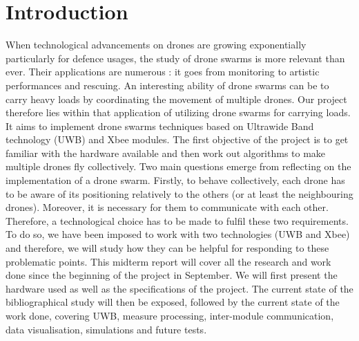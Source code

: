 \chapter*{Introduction}

When technological advancements on drones are growing exponentially particularly for defence usages, the study of drone swarms is more relevant than ever. Their applications are numerous : it goes from monitoring to artistic performances and rescuing. An interesting ability of drone swarms can be to carry heavy loads by coordinating the movement of multiple drones. Our project therefore lies within that application of utilizing drone swarms for carrying loads. It aims to implement drone swarms techniques based on Ultrawide Band technology (UWB) and Xbee modules. The first objective of the project is to get familiar with the hardware available and then work out algorithms to make multiple drones fly collectively. Two main questions emerge from reflecting on the implementation of a drone swarm. Firstly, to behave collectively, each drone has to be aware of its positioning relatively to the others (or at least the neighbouring drones). Moreover, it is necessary for them to communicate with each other. Therefore, a technological choice has to be made to fulfil these two requirements. To do so, we have been imposed to work with two technologies (UWB and Xbee) and therefore, we will study how they can be helpful for responding to these problematic points. This midterm report will cover all the research and work done since the beginning of the project in September. We will first present the hardware used as well as the specifications of the project. The current state of the bibliographical study will then be exposed, followed by the current state of the work done, covering UWB, measure processing, inter-module communication, data visualisation, simulations and future tests. 
